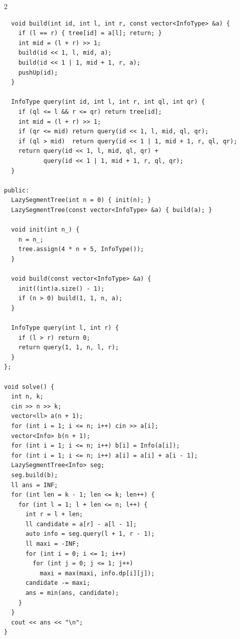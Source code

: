 \begin{multicols*}{2}
\begin{verbatim}
  void build(int id, int l, int r, const vector<InfoType> &a) {
    if (l == r) { tree[id] = a[l]; return; }
    int mid = (l + r) >> 1;
    build(id << 1, l, mid, a);
    build(id << 1 | 1, mid + 1, r, a);
    pushUp(id);
  }

  InfoType query(int id, int l, int r, int ql, int qr) {
    if (ql <= l && r <= qr) return tree[id];
    int mid = (l + r) >> 1;
    if (qr <= mid) return query(id << 1, l, mid, ql, qr);
    if (ql > mid)  return query(id << 1 | 1, mid + 1, r, ql, qr);
    return query(id << 1, l, mid, ql, qr) +
           query(id << 1 | 1, mid + 1, r, ql, qr);
  }

public:
  LazySegmentTree(int n = 0) { init(n); }
  LazySegmentTree(const vector<InfoType> &a) { build(a); }

  void init(int n_) {
    n = n_;
    tree.assign(4 * n + 5, InfoType());
  }

  void build(const vector<InfoType> &a) {
    init((int)a.size() - 1);
    if (n > 0) build(1, 1, n, a);
  }

  InfoType query(int l, int r) {
    if (l > r) return 0;
    return query(1, 1, n, l, r);
  }
};

void solve() {
  int n, k;
  cin >> n >> k;
  vector<ll> a(n + 1);
  for (int i = 1; i <= n; i++) cin >> a[i];
  vector<Info> b(n + 1);
  for (int i = 1; i <= n; i++) b[i] = Info(a[i]);
  for (int i = 1; i <= n; i++) a[i] = a[i] + a[i - 1];
  LazySegmentTree<Info> seg;
  seg.build(b);
  ll ans = INF;
  for (int len = k - 1; len <= k; len++) {
    for (int l = 1; l + len <= n; l++) {
      int r = l + len;
      ll candidate = a[r] - a[l - 1];
      auto info = seg.query(l + 1, r - 1);
      ll maxi = -INF;
      for (int i = 0; i <= 1; i++)
        for (int j = 0; j <= 1; j++)
          maxi = max(maxi, info.dp[i][j]);
      candidate -= maxi;
      ans = min(ans, candidate);
    }
  }
  cout << ans << "\n";
}
		\end{verbatim}

	\end{multicols*}

